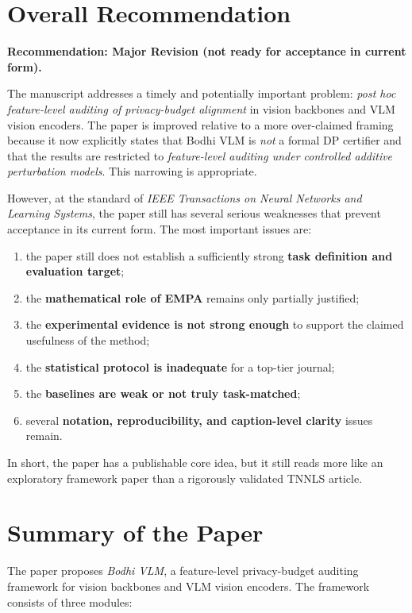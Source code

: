 
\section*{Overall Recommendation}

\textbf{Recommendation: Major Revision (not ready for acceptance in current form).}

The manuscript addresses a timely and potentially important problem: \emph{post hoc feature-level auditing of privacy-budget alignment} in vision backbones and VLM vision encoders. The paper is improved relative to a more over-claimed framing because it now explicitly states that Bodhi VLM is \emph{not} a formal DP certifier and that the results are restricted to \emph{feature-level auditing under controlled additive perturbation models}. This narrowing is appropriate.

However, at the standard of \emph{IEEE Transactions on Neural Networks and Learning Systems}, the paper still has several serious weaknesses that prevent acceptance in its current form. The most important issues are:

\begin{enumerate}
\item the paper still does not establish a sufficiently strong \textbf{task definition and evaluation target};
\item the \textbf{mathematical role of EMPA} remains only partially justified;
\item the \textbf{experimental evidence is not strong enough} to support the claimed usefulness of the method;
\item the \textbf{statistical protocol is inadequate} for a top-tier journal;
\item the \textbf{baselines are weak or not truly task-matched};
\item several \textbf{notation, reproducibility, and caption-level clarity} issues remain.
\end{enumerate}

In short, the paper has a publishable core idea, but it still reads more like an exploratory framework paper than a rigorously validated TNNLS article.

\section*{Summary of the Paper}

The paper proposes \emph{Bodhi VLM}, a feature-level privacy-budget auditing framework for vision backbones and VLM vision encoders. The framework consists of three modules:

